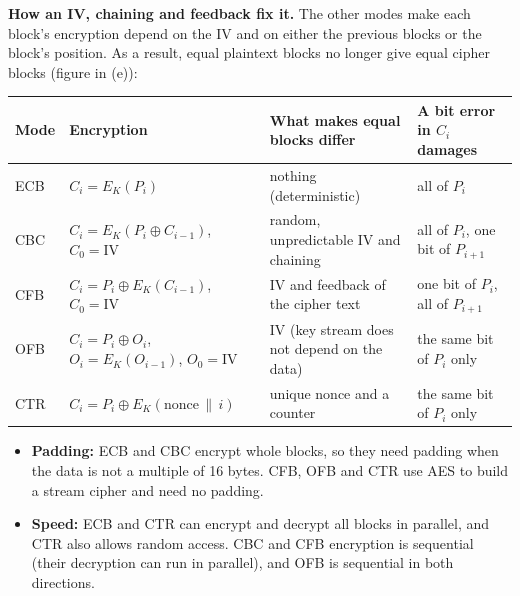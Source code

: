 \documentclass[a4paper, 10pt]{article}
\begin{document}
\begin{problem}
\begin{subproblems_alpha}
\begin{solution}
		      \textbf{How an IV, chaining and feedback fix it.}
		      The other modes make each block's encryption depend on the IV and on either the previous blocks or the block's position.
		      As a result, equal plaintext blocks no longer give equal cipher blocks (figure in (e)):
		      \begin{center}
			      \footnotesize
			      \renewcommand{\arraystretch}{1.3}
			      \begin{tabularx}{\linewidth}{l>{\raggedright\arraybackslash}p{4.1cm}>{\raggedright\arraybackslash}X>{\raggedright\arraybackslash}X}
				      \toprule
				      Mode & Encryption                                                        & What makes equal blocks differ              & A bit error in $C_i$ damages       \\
				      \midrule
				      ECB  & $C_i = E_K(P_i)$                                                  & nothing (deterministic)                     & all of $P_i$                       \\
				      CBC  & $C_i = E_K(P_i \oplus C_{i-1})$, $C_0 = \mathrm{IV}$              & random, unpredictable IV and chaining       & all of $P_i$, one bit of $P_{i+1}$ \\
				      CFB  & $C_i = P_i \oplus E_K(C_{i-1})$, $C_0 = \mathrm{IV}$              & IV and feedback of the cipher text          & one bit of $P_i$, all of $P_{i+1}$ \\
				      OFB  & $C_i = P_i \oplus O_i$, $O_i = E_K(O_{i-1})$, $O_0 = \mathrm{IV}$ & IV (key stream does not depend on the data) & the same bit of $P_i$ only         \\
				      CTR  & $C_i = P_i \oplus E_K(\mathrm{nonce} \,\|\, i)$                   & unique nonce and a counter                  & the same bit of $P_i$ only         \\
				      \bottomrule
			      \end{tabularx}
		      \end{center}
		      \begin{itemize}
			      \item \textbf{Padding:} ECB and CBC encrypt whole blocks, so they need padding when the data is not a multiple of 16 bytes.
			            CFB, OFB and CTR use AES to build a stream cipher and need no padding.
			      \item \textbf{Speed:} ECB and CTR can encrypt and decrypt all blocks in parallel, and CTR also allows random access.
			            CBC and CFB encryption is sequential (their decryption can run in parallel), and OFB is sequential in both directions.
		      \end{itemize}


\end{solution}
\end{subproblems_alpha}
\end{problem}
\end{document}
